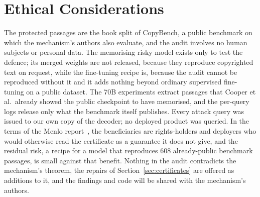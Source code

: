 \section*{Ethical Considerations}
The protected passages are the book split of CopyBench, a public benchmark on which the mechanism's authors also evaluate, and the audit involves no human subjects or personal data. The memorising risky model exists only to test the defence; its merged weights are not released, because they reproduce copyrighted text on request, while the fine-tuning recipe is, because the audit cannot be reproduced without it and it adds nothing beyond ordinary supervised fine-tuning on a public dataset. The 70B experiments extract passages that Cooper et al.\ already showed the public checkpoint to have memorised, and the per-query logs release only what the benchmark itself publishes. Every attack query was issued to our own copy of the decoder; no deployed product was queried. In the terms of the Menlo report~\cite{dittrich2012menlo}, the beneficiaries are rights-holders and deployers who would otherwise read the certificate as a guarantee it does not give, and the residual risk, a recipe for a model that reproduces 608 already-public benchmark passages, is small against that benefit. Nothing in the audit contradicts the mechanism's theorem, the repairs of Section~\ref{sec:certificates} are offered as additions to it, and the findings and code will be shared with the mechanism's authors.
